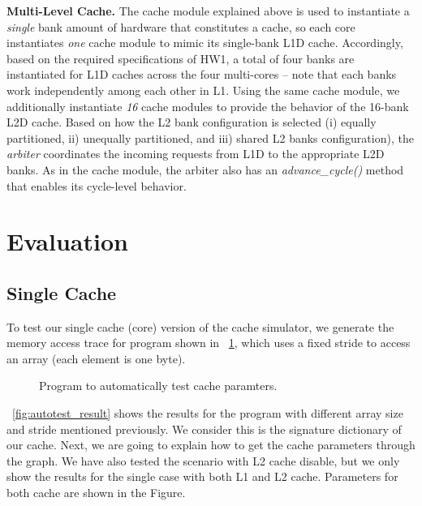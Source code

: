 \documentclass[12pt]{report}
\newcommand{\Fig}[1]{\figurename~\ref{#1}}
\begin{document}
\textbf{Multi-Level Cache.} The cache module explained above is used to instantiate a \emph{single} bank amount of hardware that constitutes a cache, so each core instantiates
\emph{one} cache module to mimic its single-bank L1D cache. Accordingly, based on the required specifications of HW1, a total of four banks
are instantiated for L1D caches across the four multi-cores -- note that each banks work independently among each other in L1. Using the same 
cache module, we additionally instantiate \emph{16} cache modules to provide the behavior of the 16-bank L2D cache. Based on how the L2 bank
configuration is selected (i) equally partitioned, ii) unequally partitioned, and iii) shared L2 banks configuration), the \emph{arbiter} coordinates the incoming requests
from L1D to the appropriate L2D banks. As in the cache module, the arbiter also has an \emph{advance\_cycle()} method that enables its cycle-level
behavior.























\newpage
\section{Evaluation}
\subsection{Single Cache}
\label{single_cache}
To test our single cache (core) version of the cache simulator, we generate the memory access trace for program shown in \Fig{fig:autotest}, which uses a fixed stride to access an array (each element is one byte). 

\begin{figure}[ht]

\caption{Program to automatically test cache paramters.}
\label{fig:autotest}
\end{figure}

\Fig{fig:autotest_result} shows the results for the program with different array size and stride mentioned previously. We consider this is the signature dictionary of our cache. Next, we are going to explain how to get the cache parameters through the graph. We have also tested the scenario with L2 cache disable, but we only show the results for the single case with both L1 and L2 cache. Parameters for both cache are shown in the Figure.
\end{document}
